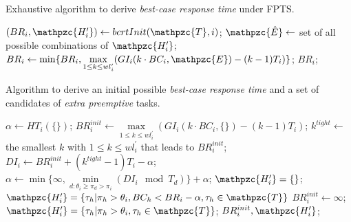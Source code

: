 \documentclass[fleqn]{article}
\begin{document}
\begin{algorithm}[H]
	\caption{Exhaustive algorithm to derive \textit{best-case response time} under FPTS.}\label{euclid}
	\begin{algorithmic}[1]
		\State $(BR_i, \mathpzc{H^{\prime}_i}) \gets bcrtInit( \mathpzc{T},i)$;
		\State $\mathpzc{\hat{E}} \gets$ set of all possible combinations of  $\mathpzc{H^{\prime}_i}$;
		\State $BR_i \gets \min\{BR_i, \max \limits_{1 \leq k \leq wl^{\prime}_i} (GI_i(k \cdot BC_i, \mathpzc{E}) - (k-1)T_i)\}$;
		\State \Return $BR_i$; 
		\EndProcedure
	\end{algorithmic}
\end{algorithm}

\begin{algorithm}[H]
	\caption{Algorithm to derive an initial possible \textit{best-case response time} and a set of candidates of \textit{extra preemptive} tasks.}\label{euclid}
	\begin{algorithmic}[1]
		\State $\alpha \gets HT_i(\{\})$;
		\State $BR^{init}_i \gets \max \limits_{1 \leq k \leq wl^{\prime}_i} (GI_i(k \cdot BC_i, \{\}) - (k-1)T_i)$;
		\State $k^{tight} \gets$ the smallest $k$ with $1 \leq k \leq wl^{\prime}_i$ that leads to $BR^{init}_i$;
		\State $DI_i \gets BR^{init}_i + (k^{tight}-1)T_i - \alpha$;
		\State $\alpha \gets \min \{\infty , \min \limits_{d:\theta_i \geq \pi_d > \pi_i} (DI_i \mod T_d)\} + \alpha$;
		\State $\mathpzc{H^{\prime}_i} = \{\}$;
		\Else
		\State $\mathpzc{H^{\prime}_i} = \{\tau_h | \pi_h > \theta_i, BC_h < BR_i - \alpha, \tau_h \in \mathpzc{T}\}$
		\Else
		\State $BR^{init}_i \gets\infty$; 
		\State $\mathpzc{H^{\prime}_i} = \{\tau_h | \pi_h > \theta_i, \tau_h \in \mathpzc{T}\}$;
		\State \Return $BR^{init}_i, \mathpzc{H^{\prime}_i}$; 
		\EndProcedure
	\end{algorithmic}
\end{algorithm}
\end{document}
